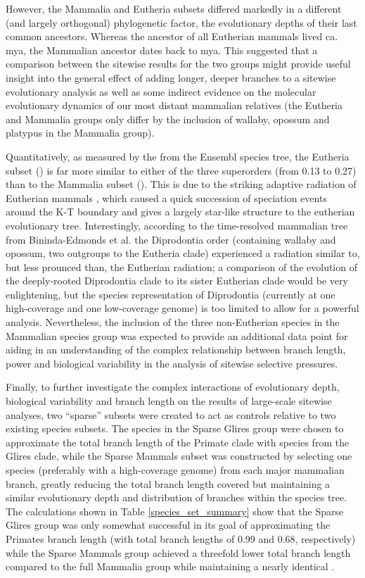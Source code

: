 However, the Mammalia and Eutheria subsets differed markedly in a
different (and largely orthogonal) phylogenetic factor, the
evolutionary depths of their last common ancestors. Whereas the
ancestor of all Eutherian mammals lived ca.  mya, the
Mammalian ancestor dates back to  mya. This suggested that a
comparison between the sitewise results for the two groups might
provide useful insight into the general effect of adding longer,
deeper branches to a sitewise evolutionary analysis as well as some
indirect evidence on the molecular evolutionary dynamics of our most
distant mammalian relatives (the Eutheria and Mammalia groups only
differ by the inclusion of wallaby, opossum and platypus in the
Mammalia group).

Quantitatively, as measured by the \mpl from the Ensembl species tree,
the Eutheria subset () is far more similar to either of the
three superorders (\mpl from 0.13 to 0.27) than to the Mammalia subset
(). This is due to the striking adaptive radiation of
Eutherian mammals \citep{todo, Archibald science 1999
  10.1126/science.285.5436.2031a and Bininda-Edmonds et al. nature
  2007}, which caused a quick succession of speciation events around
the K-T boundary and gives a largely star-like structure to the
eutherian evolutionary tree. Interestingly, according to the
time-resolved mammalian tree from Bininda-Edmonds et
al. \citeyearpar{todo} the Diprodontia order (containing wallaby and
opossum, two outgroups to the Eutheria clade) experienced a radiation
similar to, but less prounced than, the Eutherian radiation; a
comparison of the evolution of the deeply-rooted Diprodontia clade to
its sister Eutherian clade would be very enlightening, but the species
representation of Diprodontia (currently at one high-coverage and one
low-coverage genome) is too limited to allow for a powerful
analysis. Nevertheless, the inclusion of the three non-Eutherian
species in the Mammalian species group was expected to provide an
additional data point for aiding in an understanding of the complex
relationship between branch length, power and biological variability
in the analysis of sitewise selective pressures.

Finally, to further investigate the complex interactions of
evolutionary depth, biological variability and branch length on the
results of large-scale sitewise analyses, two ``sparse'' subsets were
created to act as controls relative to two existing species
subsets. The species in the Sparse Glires group were chosen to
approximate the total branch length of the Primate clade with species
from the Glires clade, while the Sparse Mammals subset was constructed
by selecting one species (preferably with a high-coverage genome) from
each major mammalian branch, greatly reducing the total branch length
covered but maintaining a similar evolutionary depth and distribution
of branches within the species tree. The calculations shown in Table
\ref{species_set_summary} show that the Sparse Glires group was only
somewhat successful in its goal of approximating the Primates branch
length (with total branch lengths of 0.99 and 0.68, respectively)
while the Sparse Mammals group achieved a threefold lower total branch
length compared to the full Mammalia group while maintaining a nearly
identical \mpl.

